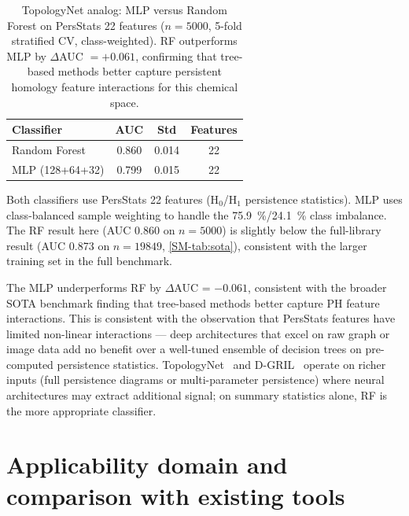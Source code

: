 \documentclass[11pt,a4paper]{article}
\begin{document}
\begin{table}[htbp]
\centering
\caption{TopologyNet analog: MLP versus Random Forest on PersStats 22 features ($n = \num{5000}$, 5-fold stratified CV, class-weighted). RF outperforms MLP by $\Delta$AUC $= +\num{0.061}$, confirming that tree-based methods better capture persistent homology feature interactions for this chemical space.}
\label{tab:topologynet_analog}
\begin{tabularx}{\textwidth}{l S[table-format=1.4] S[table-format=1.4] S[table-format=1.0]}
\toprule
{Classifier} & {AUC} & {Std} & {Features} \\
\midrule
Random Forest & 0.860 & 0.014 & 22 \\
MLP (128+64+32) & 0.799 & 0.015 & 22 \\
\bottomrule
\end{tabularx}
\vspace{1mm}
\footnotesize Both classifiers use PersStats 22 features (H$_0$/H$_1$ persistence statistics). MLP uses class-balanced sample weighting to handle the \qty{75.9}{\percent}/\qty{24.1}{\percent} class imbalance. The RF result here (AUC \num{0.860} on $n = \num{5000}$) is slightly below the full-library result (AUC \num{0.873} on $n = \num{19849}$, \cref{SM-tab:sota}), consistent with the larger training set in the full benchmark.
\end{table}

The MLP underperforms RF by $\Delta$AUC = $-0.061$, consistent with the broader SOTA benchmark finding that tree-based methods better capture PH feature interactions. This is consistent with the observation that PersStats features have limited non-linear interactions --- deep architectures that excel on raw graph or image data add no benefit over a well-tuned ensemble of decision trees on pre-computed persistence statistics. TopologyNet~\citep{topologynet_2018} and D-GRIL~\citep{dgril_2026} operate on richer inputs (full persistence diagrams or multi-parameter persistence) where neural architectures may extract additional signal; on summary statistics alone, RF is the more appropriate classifier.

\vspace{4mm}


\section{Applicability domain and comparison with existing tools}
\label{sec:applicability_comparison}
\end{document}

